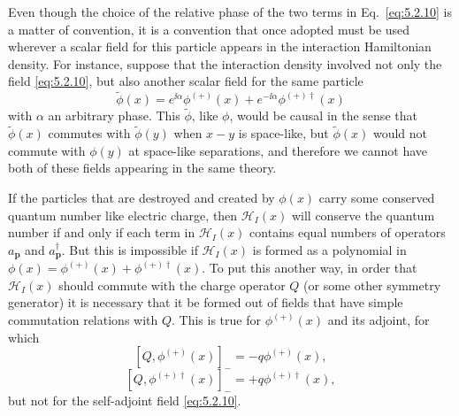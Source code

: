 Even though the choice of the relative phase of the two terms in Eq.~\eqref{eq:5.2.10}
is a matter of convention, it is a convention that once adopted must be used
wherever a scalar field for this particle appears in the interaction Hamiltonian
density. For instance, suppose that the interaction density involved not only
the field \eqref{eq:5.2.10}, but also another scalar field for the same particle
\[
  \widetilde\phi(x)=e^{\ii\alpha}\phi^{(+)}(x)
  +e^{-\ii\alpha}\phi^{(+)\dagger}(x)
\]
with $\alpha$ an arbitrary phase. This $\widetilde\phi$, like $\phi$, would be
causal in the sense that $\widetilde\phi(x)$ commutes with
$\widetilde\phi(y)$ when $x-y$ is space-like, but $\widetilde\phi(x)$ would not
commute with $\phi(y)$ at space-like separations, and therefore we cannot have
both of these fields appearing in the same theory.

If the particles that are destroyed and created by $\phi(x)$ carry some
conserved quantum number like electric charge, then $\mathcal{H}_I(x)$ will
conserve the quantum number if and only if each term in $\mathcal{H}_I(x)$
contains equal numbers of operators $a_{\mathbf{p}}$ and $a^\dagger_{\mathbf{p}}$.
But this is impossible if $\mathcal{H}_I(x)$ is formed as a polynomial in
$\phi(x)=\phi^{(+)}(x)+\phi^{(+)\dagger}(x)$. To put this another way, in
order that $\mathcal{H}_I(x)$ should commute with the charge operator $Q$
(or some other symmetry generator) it is necessary that it be formed out of
fields that have simple commutation relations with $Q$. This is true for
$\phi^{(+)}(x)$ and its adjoint, for which
\[
  [Q,\phi^{(+)}(x)]_-=-q\phi^{(+)}(x),
\]
\[
  [Q,\phi^{(+)\dagger}(x)]_-=+q\phi^{(+)\dagger}(x),
\]
but not for the self-adjoint field \eqref{eq:5.2.10}.

